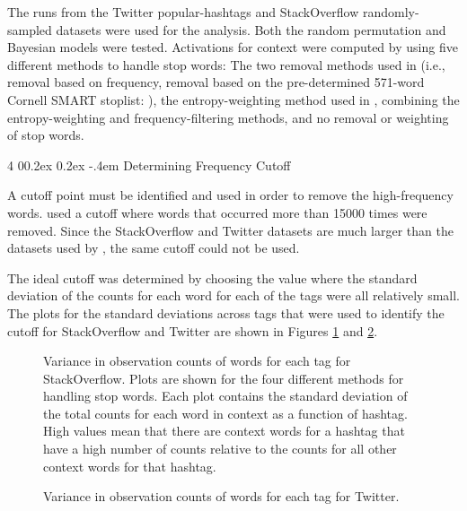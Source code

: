 \documentclass[man,floatsintext,donotrepeattitle]{apa6}
\makeatletter
\renewcommand{\paragraph}{%
  \@startsection
  {paragraph}%
  {4}%
  {\parindent}%
  {0\baselineskip \@plus 0.2ex \@minus 0.2ex}%
  {-.4em}%
  {\normalfont\normalsize\bfseries\itshape\addperi}}
\makeatother
\begin{document}
The runs from the Twitter popular-hashtags and StackOverflow randomly-sampled datasets were used for the analysis.
Both the random permutation and Bayesian models were tested.
Activations for context were computed by using five different methods to handle stop words:
The two removal methods used in \textcite{Sahlgren2008}
(i.e., removal based on frequency, removal based on the pre-determined 571-word Cornell SMART stoplist: ),
the entropy-weighting method used in \textcite{Stanley2013},
combining the entropy-weighting and frequency-filtering methods,
and no removal or weighting of stop words.

\paragraph{Determining Frequency Cutoff}

A cutoff point must be identified and used in order to remove the high-frequency words.
\textcite{Sahlgren2008} used a cutoff where words that occurred more than \num{15000} times were removed.
Since the StackOverflow and Twitter datasets are much larger than the datasets used by \citeauthor{Sahlgren2008}, the same cutoff could not be used.

The ideal cutoff was determined by choosing the value where the standard deviation of the counts for each word for each of the tags were all relatively small.
The plots for the standard deviations across tags that were used to identify the cutoff for StackOverflow and Twitter are shown in Figures \ref{figContextCutoffSO} and \ref{figContextCutoffT}.

\begin{figure}[!htbp]
  \caption{
    Variance in observation counts of words for each tag for StackOverflow.
    Plots are shown for the four different methods for handling stop words.
    Each plot contains the standard deviation of the total counts for each word in context as a function of hashtag.
    High values mean that there are context words for a hashtag that have a high number of counts relative to the counts for all other context words for that hashtag.
  }
  \label{figContextCutoffSO}
\end{figure}

\begin{figure}[!htbp]
  \caption{
    Variance in observation counts of words for each tag for Twitter.
  }
  \label{figContextCutoffT}
\end{figure}
\end{document}
